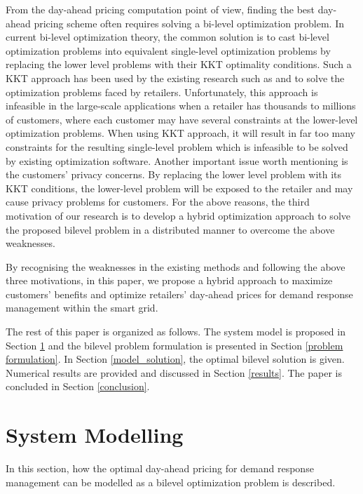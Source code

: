 \documentclass[10pt,journal]{IEEEtran}
\theoremstyle{definition}
\theoremstyle{plain} \newtheorem{theo}{Theorem} \newtheorem{prop}{Proposition}  \newtheorem{lemm}{Lemma}
\begin{document}
From the day-ahead pricing computation point of view, finding the best day-ahead pricing scheme often requires solving a bi-level optimization problem.
In  current bi-level optimization theory, the common solution is to cast bi-level optimization problems into equivalent single-level optimization problems by replacing the lower level problems with their KKT optimality conditions.
Such a KKT approach has been used by the existing research such as \cite{zugno2013bilevel} and \cite{momberretail} to solve the optimization problems faced by retailers. 
Unfortunately, this approach is infeasible in the large-scale applications when a retailer has thousands to millions of customers, where each customer may have several constraints at the lower-level optimization problems. When using KKT approach, it will result in far too many constraints for the resulting single-level problem which is infeasible to be solved by existing optimization software. 
Another important issue worth mentioning is the customers' privacy concerns. By replacing the lower level problem with its KKT conditions, the lower-level problem will be exposed to the retailer and may cause privacy problems for customers. For the above reasons, the third motivation of our research is to develop a hybrid optimization approach to solve the proposed bilevel problem in a distributed manner to overcome the above weaknesses.



By recognising the weaknesses in the existing methods and following the above three motivations, in this paper, we propose a hybrid approach to maximize customers' benefits and optimize retailers' day-ahead prices for demand response management within the smart grid. 















The rest of this paper is organized as follows. The system model is proposed in Section \ref{model} and the bilevel problem formulation is presented in Section \ref{problem formulation}. In Section \ref{model_solution}, the optimal bilevel solution is given. Numerical results are provided and discussed in Section \ref{results}. The paper is concluded in Section \ref{conclusion}.

\section{System Modelling} \label{model} 
In this section, how the optimal day-ahead pricing for demand response management can be modelled as a bilevel optimization problem is described. 
\end{document}
